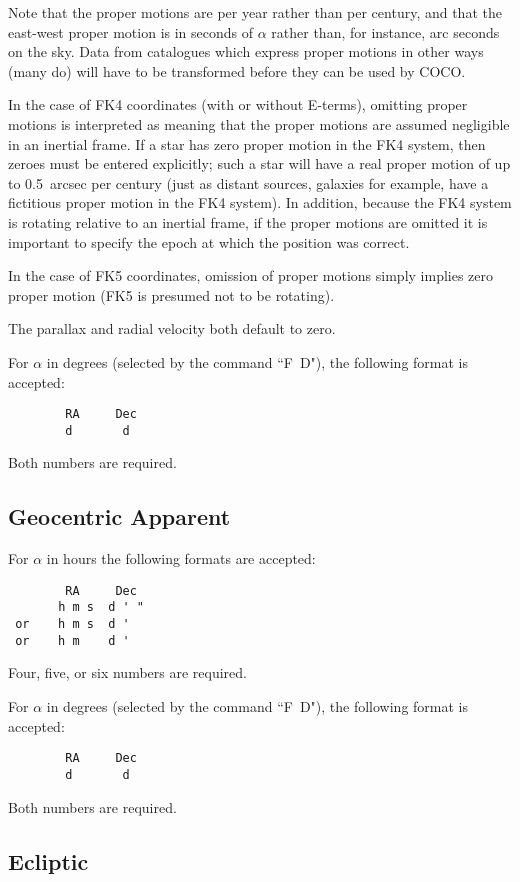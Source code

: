 Note that the proper motions are per year rather than per
century, and that the east-west proper motion
is in seconds of $\alpha$ rather than, for instance, arc seconds on
the sky.
Data from catalogues which express proper motions
in other ways (many do) will have to be transformed before
they can be used by COCO.

In the case of FK4 coordinates (with or without E-terms), omitting
proper motions is interpreted as meaning that the proper motions
are assumed negligible in an inertial frame.
If a star has zero proper motion in the FK4 system, then zeroes must
be entered explicitly; such a star will have a real proper motion of
up to 0.5~arcsec per century (just as distant sources, galaxies
for example, have a fictitious proper motion in the FK4 system).
In addition, because the FK4 system is rotating relative to an
inertial frame, if the proper motions are omitted it is important to
specify the epoch at which the position was correct.

In the case of FK5 coordinates, omission of proper motions
simply implies zero proper motion (FK5 is presumed not to
be rotating).

The parallax and radial velocity both default to zero.

For $\alpha$ in degrees (selected by the command ``F~D"), the
following format is accepted:
\begin{verbatim}
        RA     Dec
        d       d
\end{verbatim}

Both numbers are required.

\subsection{Geocentric Apparent}

For $\alpha$ in hours the following formats are accepted:
\begin{verbatim}
        RA     Dec
       h m s  d ' "
 or    h m s  d '
 or    h m    d '
\end{verbatim}

Four, five, or six numbers are required.

For $\alpha$ in degrees (selected by the command ``F~D"), the
following format is accepted:
\begin{verbatim}
        RA     Dec
        d       d
\end{verbatim}

Both numbers are required.

\subsection{Ecliptic}

